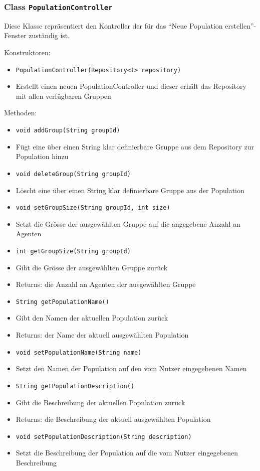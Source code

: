 \documentclass[parskip=full,11pt]{scrartcl}
\begin{document}
\subsubsection{Class \texttt{PopulationController}}
Diese Klasse repräsentiert den Kontroller der für das \enquote{Neue Population erstellen}-Fenster zuständig ist.

Konstruktoren:
\begin{itemize}\itemsep -10pt
\item \texttt{PopulationController(Repository<t> repository)}
\item[] Erstellt einen neuen PopulationController und dieser erhält das Repository mit allen verfügbaren Gruppen
\end{itemize}

Methoden:
\begin{itemize}\itemsep -10pt
\item \texttt{void addGroup(String groupId)}
\item[] Fügt eine über einen String klar definierbare Gruppe aus dem Repository zur Population hinzu

\item \texttt{void deleteGroup(String groupId)}
\item[] Löscht eine über einen String klar definierbare Gruppe aus der Population

\item \texttt{void setGroupSize(String groupId, int size)}
\item[] Setzt die Grösse der ausgewählten Gruppe auf die angegebene Anzahl an Agenten

\item \texttt{int getGroupSize(String groupId)}
\item[] Gibt die Grösse der ausgewählten Gruppe zurück
\item[] Returns: die Anzahl an Agenten der ausgewählten Gruppe

\item \texttt{String getPopulationName()}
\item[] Gibt den Namen der aktuellen Population zurück
\item[] Returns: der Name der aktuell ausgewählten Population

\item \texttt{void setPopulationName(String name)}
\item[] Setzt den Namen der Population auf den vom Nutzer eingegebenen Namen

\item \texttt{String getPopulationDescription()}
\item[] Gibt die Beschreibung der aktuellen Population zurück
\item[] Returns: die Beschreibung der aktuell ausgewählten Population

\item \texttt{void setPopulationDescription(String description)}
\item[] Setzt die Beschreibung der Population auf die vom Nutzer eingegebenen Beschreibung

\end{itemize}
\end{document}
